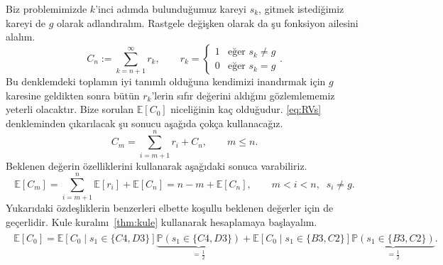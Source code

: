 Biz problemimizde $k$'inci ad{\i}mda bulundu\u{g}umuz kareyi $s_k$, gitmek
istedi\u{g}imiz kareyi de $g$ olarak adland{\i}ral{\i}m. Rastgele
de\u{g}i\c{s}ken olarak da \c{s}u fonksiyon ailesini alal{\i}m.
\begin{equation}
    C_n := \sum_{k=n+1}^\infty r_k, \qquad r_k = 
\begin{cases}
    1 & \mbox{e\u{g}er } s_k \neq g \\
    0 & \mbox{e\u{g}er } s_k = g
\end{cases}.
\label{eq:RVs}
\end{equation}
Bu denklemdeki toplam{\i}n iyi tan{\i}ml{\i} oldu\u{g}una kendimizi
inand{\i}rmak i\c{c}in $g$ karesine geldikten sonra b\"{u}t\"{u}n $r_k$'lerin
s{\i}f{\i}r de\u{g}erini ald{\i}\u{g}{\i}n{\i} g\"{o}zlemlememiz yeterli
olacakt{\i}r. Bize sorulan $\mathbb{E}[C_0]$ niceli\u{g}inin ka\c{c}
oldu\u{g}udur. \eqref{eq:RVs} denkleminden \c{c}{\i}kar{\i}lacak \c{s}u sonucu
a\c{s}a\u{g}{\i}da \c{c}ok\c{c}a kullanaca\u{g}{\i}z.
\begin{equation*} 
    C_m = \sum_{i=m+1}^n r_i + C_n, \qquad m \leq n.
\end{equation*}
Beklenen de\u{g}erin \"{o}zelliklerini kullanarak a\c{s}a\u{g}{\i}daki sonuca
varabiliriz.
\begin{equation*} 
    \mathbb{E}[C_m] = \sum_{i=m+1}^n \mathbb{E}[r_i] + \mathbb{E}[C_n] = n-m + \mathbb{E}[C_n],
    \qquad m < i < n, \;\; s_i \neq g.
\end{equation*}
Yukar{\i}daki \"{o}zde\c{s}liklerin benzerleri elbette ko\c{s}ullu beklenen
de\u{g}erler i\c{c}in de ge\c{c}erlidir. Kule kural{\i}n{\i}~\ref{thm:kule}
kullanarak hesaplamaya ba\c{s}layal{\i}m.
%
\vspace{-0mm}
\begin{align}
    \begin{split}
    \mathbb{E}[C_0] = \mathbb{E}\left[ C_0 \mid s_1 \in \{C4, D3\} \right] 
    \underbrace{\mathbb{P}(s_1 \in \{C4, D3\})}_{=\frac{1}{2}} +
    \mathbb{E}\left[ C_0 \mid s_1 \in \{B3, C2\} 
    \right] \underbrace{\mathbb{P}(s_1 \in \{B3, C2\})}_{=\frac{1}{2}}.
    \end{split}
    \label{eq:tower1}
\end{align}

